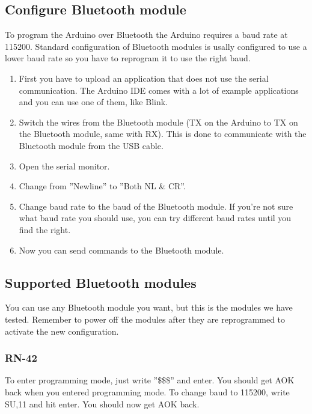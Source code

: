 		
		
		\subsection{Configure Bluetooth module}
		To program the Arduino over Bluetooth the Arduino requires a baud rate at 115200. Standard configuration of Bluetooth modules is usally configured to use a lower baud rate so you have to reprogram it to use the right baud.\\
		
		\begin{enumerate}
		\item First you have to upload an application that does not use the serial communication. The Arduino IDE comes with a lot of example applications and you can use one of them, like Blink.
		
		\item Switch the wires from the Bluetooth module (TX on the Arduino to TX on the Bluetooth module, same with RX). This is done to communicate with the Bluetooth module from the USB cable.
		
		\item Open the serial monitor.
		
		\item Change from ''Newline'' to ''Both NL \& CR''.
		
		\item Change baud rate to the baud of the Bluetooth module. If you're not sure what baud rate you should use, you can try different baud rates until you find the right.
		
		\item Now you can send commands to the Bluetooth module.
		\end{enumerate}

			\subsection{Supported Bluetooth modules}
			You can use any Bluetooth module you want, but this is the modules we have tested. Remember to power off the modules after they are reprogrammed to activate the new configuration.
			
				\subsubsection{RN-42}
				To enter programming mode, just write ''\$\$\$'' and enter. You should get AOK back when you entered programming mode. To change baud to 115200, write SU,11 and hit enter. You should now get AOK back.\\
				
